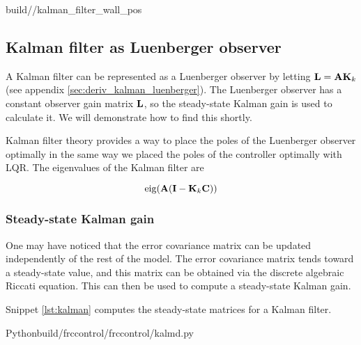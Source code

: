 \begin{svg}{build/\chapterpath/kalman_filter_wall_pos}
  \caption{Wall position estimate and variance with Kalman filter}
  \label{fig:filter_wall_pos}
\end{svg}

\subsection{Kalman filter as Luenberger observer}

A Kalman filter can be represented as a Luenberger \gls{observer} by letting
$\mathbf{L} = \mathbf{A} \mathbf{K}_k$ (see appendix \ref{sec:deriv_kalman_luenberger}).
The Luenberger observer has a constant observer gain matrix $\mathbf{L}$, so the
steady-state Kalman gain is used to calculate it. We will demonstrate how to
find this shortly.

Kalman filter theory provides a way to place the poles of the Luenberger
observer optimally in the same way we placed the poles of the controller
optimally with LQR. The eigenvalues of the Kalman filter are

\begin{equation}
  \operatorname{eig}(\mathbf{A}(\mathbf{I} - \mathbf{K}_k\mathbf{C}))
\end{equation}

\subsubsection{Steady-state Kalman gain}

One may have noticed that the error covariance matrix can be updated
independently of the rest of the \gls{model}. The error covariance matrix tends
toward a steady-state value, and this matrix can be obtained via the discrete
algebraic Riccati equation. This can then be used to compute a steady-state
Kalman gain.

Snippet \ref{lst:kalman} computes the steady-state matrices for a Kalman
filter.

\begin{code}{Python}{build/frccontrol/frccontrol/kalmd.py}
  \caption{Steady-state Kalman gain and error covariance matrices calculation in
    Python}
  \label{lst:kalman}
\end{code}
